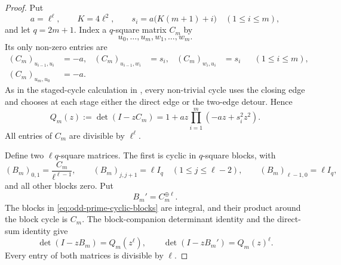 \begin{proof}
Put
\begin{equation}\label{eq:odd-prime-construction-parameters}
 a=\ell^\ell,
 \qquad K=4\ell^2,
 \qquad s_i=a\bigl(K(m+1)+i\bigr)\quad(1\le i\le m),
\end{equation}
and let \(q=2m+1\).  Index a \(q\)-square matrix \(C_m\) by
\[
 u_0,\ldots,u_m,w_1,\ldots,w_m.
\]
Its only non-zero entries are
\begin{align*}
 (C_m)_{u_{i-1},u_i}&=-a,&
 (C_m)_{u_{i-1},w_i}&=s_i,&
 (C_m)_{w_i,u_i}&=s_i &&(1\le i\le m),\\
 (C_m)_{u_m,u_0}&=-a.
\end{align*}
As in the staged-cycle calculation in
, every non-trivial cycle uses
the closing edge and chooses at each stage either the direct edge or the
two-edge detour.  Hence
\begin{equation}\label{eq:odd-prime-staged-determinant}
 Q_m(z):=\det(I-zC_m)
 =1+az\prod_{i=1}^m(-az+s_i^2z^2).
\end{equation}
All entries of \(C_m\) are divisible by \(\ell^\ell\).

Define two \(\ell q\)-square matrices.  The first is cyclic in
\(q\)-square blocks, with
\begin{equation}\label{eq:odd-prime-cyclic-blocks}
 (B_m)_{0,1}=\frac{C_m}{\ell^{\ell-1}},
 \qquad
 (B_m)_{j,j+1}=\ell I_q\quad(1\le j\le\ell-2),
 \qquad
 (B_m)_{\ell-1,0}=\ell I_q,
\end{equation}
and all other blocks zero.  Put
\begin{equation}\label{eq:odd-prime-direct-sum-block}
 B_m'=C_m^{\oplus\ell}.
\end{equation}
The blocks in \eqref{eq:odd-prime-cyclic-blocks} are integral, and their
product around the block cycle is \(C_m\).  The block-companion determinant
identity and the direct-sum identity give
\begin{equation}\label{eq:odd-prime-block-determinants}
 \det(I-zB_m)=Q_m(z^\ell),
 \qquad
 \det(I-zB_m')=Q_m(z)^\ell.
\end{equation}
Every entry of both matrices is divisible by \(\ell\).


\end{proof}
